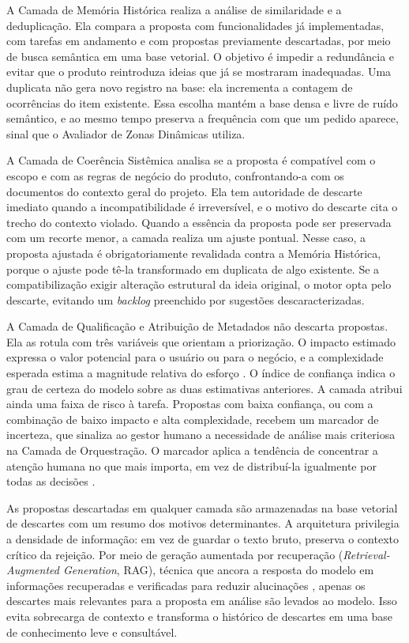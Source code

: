 A Camada de Memória Histórica realiza a análise de similaridade e a deduplicação. Ela compara a proposta com funcionalidades já implementadas, com tarefas em andamento e com propostas previamente descartadas, por meio de busca semântica em uma base vetorial. O objetivo é impedir a redundância e evitar que o produto reintroduza ideias que já se mostraram inadequadas. Uma duplicata não gera novo registro na base: ela incrementa a contagem de ocorrências do item existente. Essa escolha mantém a base densa e livre de ruído semântico, e ao mesmo tempo preserva a frequência com que um pedido aparece, sinal que o Avaliador de Zonas Dinâmicas utiliza.

A Camada de Coerência Sistêmica analisa se a proposta é compatível com o escopo e com as regras de negócio do produto, confrontando-a com os documentos do contexto geral do projeto. Ela tem autoridade de descarte imediato quando a incompatibilidade é irreversível, e o motivo do descarte cita o trecho do contexto violado. Quando a essência da proposta pode ser preservada com um recorte menor, a camada realiza um ajuste pontual. Nesse caso, a proposta ajustada é obrigatoriamente revalidada contra a Memória Histórica, porque o ajuste pode tê-la transformado em duplicata de algo existente. Se a compatibilização exigir alteração estrutural da ideia original, o motor opta pelo descarte, evitando um \textit{backlog} preenchido por sugestões descaracterizadas.

A Camada de Qualificação e Atribuição de Metadados não descarta propostas. Ela as rotula com três variáveis que orientam a priorização. O impacto estimado expressa o valor potencial para o usuário ou para o negócio, e a complexidade esperada estima a magnitude relativa do esforço \cite{burte2025sdlc}. O índice de confiança indica o grau de certeza do modelo sobre as duas estimativas anteriores. A camada atribui ainda uma faixa de risco à tarefa. Propostas com baixa confiança, ou com a combinação de baixo impacto e alta complexidade, recebem um marcador de incerteza, que sinaliza ao gestor humano a necessidade de análise mais criteriosa na Camada de Orquestração. O marcador aplica a tendência de concentrar a atenção humana no que mais importa, em vez de distribuí-la igualmente por todas as decisões \cite{anthropic2026trends}.

As propostas descartadas em qualquer camada são armazenadas na base vetorial de descartes com um resumo dos motivos determinantes. A arquitetura privilegia a densidade de informação: em vez de guardar o texto bruto, preserva o contexto crítico da rejeição. Por meio de geração aumentada por recuperação (\textit{Retrieval-Augmented Generation}, RAG), técnica que ancora a resposta do modelo em informações recuperadas e verificadas para reduzir alucinações \cite{abouali2025agentic}, apenas os descartes mais relevantes para a proposta em análise são levados ao modelo. Isso evita sobrecarga de contexto e transforma o histórico de descartes em uma base de conhecimento leve e consultável.

